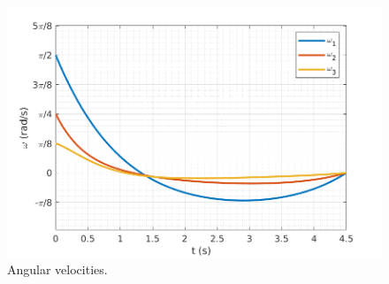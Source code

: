 \documentclass{beamer}
\begin{document}
\begin{frame}[t]
{\begin{columns}
{\begin{figure}
					\includegraphics[width=\linewidth]{./results/detumbling_fixed_nonlinear_jnd/figures_angveloc}
					\caption{Angular velocities.}
				\end{figure}
			}
		\end{columns}
	}
\end{frame}
\end{document}

